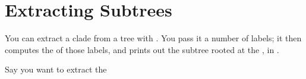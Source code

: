 

\section{Extracting Subtrees}
\label{sct_subtrees}

You can extract a clade from a tree with \clade. You pass it a number of
labels; it then computes the \lca{} of those labels, and prints out the
subtree rooted at the \lca, in \nw.

Say you want to extract the 

